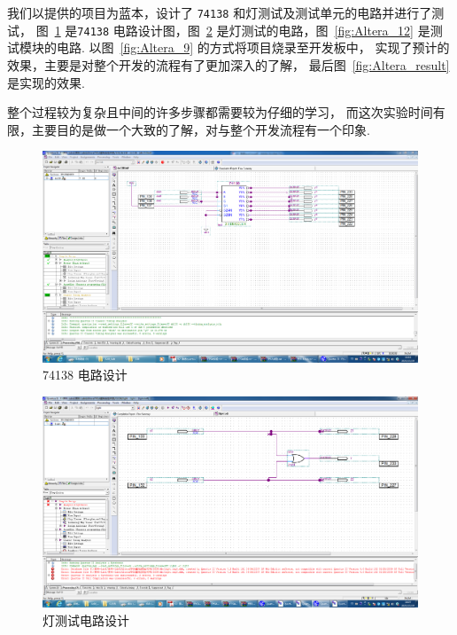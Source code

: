 \documentclass[11pt]{SEU-Digital-Report}
\begin{document}
      \emptyline

      我们以提供的项目为蓝本，设计了 \texttt{74138} 和灯测试及测试单元的电路并进行了测试，
      图~\ref{fig:Altera_8} 是\texttt{74138} 电路设计图，图~\ref{fig:Altera_11} 是灯测试的电路，图~\ref{fig:Altera_12} 是测试模块的电路.
      以图~\ref{fig:Altera_9} 的方式将项目烧录至开发板中，
      实现了预计的效果，主要是对整个开发的流程有了更加深入的了解，
      最后图~\ref{fig:Altera_result} 是实现的效果.

      \begin{analyze}{}{}
        整个过程较为复杂且中间的许多步骤都需要较为仔细的学习，
        而这次实验时间有限，主要目的是做一个大致的了解，对与整个开发流程有一个印象.
      \end{analyze}

      \begin{figure}[htbp]
        \includegraphics[width=\linewidth]{fig/Altera/8.PNG}
        \caption{74138 电路设计}
        \label{fig:Altera_8}
      \end{figure}

      \begin{figure}[htbp]
        \includegraphics[width=\linewidth]{fig/Altera/11.PNG}
        \caption{灯测试电路设计}
        \label{fig:Altera_11}
      \end{figure}
\end{document}
